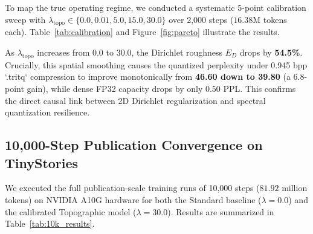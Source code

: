 \documentclass[11pt,a4paper]{article}
\begin{document}
To map the true operating regime, we conducted a systematic 5-point calibration sweep with $\lambda_{\text{topo}} \in \{0.0, 0.01, 5.0, 15.0, 30.0\}$ over 2,000 steps ($16.38$M tokens each). Table~\ref{tab:calibration} and Figure~\ref{fig:pareto} illustrate the results.

\begin{table}[h]
    \centering
    \small
    \caption{\textbf{Hyperparameter Calibration Sweep (TinyStories 10M, 2,000 steps, A10G GPU).}}
    \label{tab:calibration}
\end{table}

As $\lambda_{\text{topo}}$ increases from $0.0$ to $30.0$, the Dirichlet roughness $E_D$ drops by \textbf{54.5\%}. Crucially, this spatial smoothing causes the quantized perplexity under 0.945 bpp `.tritq` compression to improve monotonically from \textbf{46.60 down to 39.80} (a 6.8-point gain), while dense FP32 capacity drops by only $0.50$ PPL. This confirms the direct causal link between 2D Dirichlet regularization and spectral quantization resilience.

\subsection{10,000-Step Publication Convergence on TinyStories}
We executed the full publication-scale training runs of 10,000 steps ($81.92$ million tokens) on NVIDIA A10G hardware for both the Standard baseline ($\lambda=0.0$) and the calibrated Topographic model ($\lambda=30.0$). Results are summarized in Table~\ref{tab:10k_results}.
\end{document}
